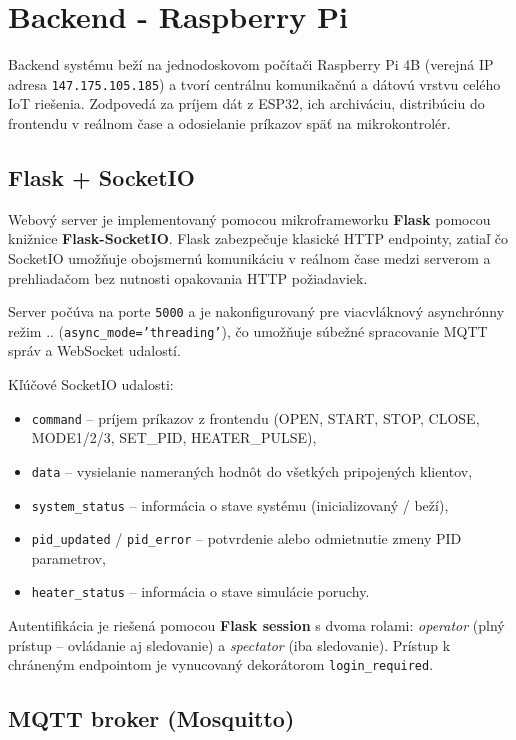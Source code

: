 \section{Backend - Raspberry Pi}

Backend systému beží na jednodoskovom počítači Raspberry Pi 4B (verejná IP adresa
\texttt{147.175.105.185}) a tvorí centrálnu komunikačnú a dátovú vrstvu celého IoT
riešenia. Zodpovedá za príjem dát z ESP32, ich archiváciu, distribúciu do frontendu
v reálnom čase a odosielanie príkazov späť na mikrokontrolér.

\subsection{Flask + SocketIO}

Webový server je implementovaný pomocou mikroframeworku \textbf{Flask} pomocou
knižnice \textbf{Flask-SocketIO}. Flask zabezpečuje klasické HTTP endpointy, zatiaľ čo SocketIO umožňuje obojsmernú
komunikáciu v reálnom čase medzi serverom a prehliadačom bez nutnosti opakovania
HTTP požiadaviek.

Server počúva na porte \texttt{5000} a je nakonfigurovaný pre viacvláknový asynchrónny
režim ..
(\texttt{async\_mode='threading'}), čo umožňuje súbežné spracovanie MQTT správ
a WebSocket udalostí.

Kľúčové SocketIO udalosti:
\begin{itemize}
  \item \texttt{command} -- príjem príkazov z frontendu (OPEN, START, STOP, CLOSE,
        MODE1/2/3, SET\_PID, HEATER\_PULSE),
  \item \texttt{data} -- vysielanie nameraných hodnôt do všetkých pripojených klientov,
  \item \texttt{system\_status} -- informácia o stave systému (inicializovaný / beží),
  \item \texttt{pid\_updated} / \texttt{pid\_error} -- potvrdenie alebo odmietnutie
        zmeny PID parametrov,
  \item \texttt{heater\_status} -- informácia o stave simulácie poruchy.
\end{itemize}

Autentifikácia je riešená pomocou \textbf{Flask session} s dvoma rolami:
\textit{operator} (plný prístup – ovládanie aj sledovanie) a \textit{spectator}
(iba sledovanie). Prístup k chráneným endpointom je vynucovaný dekorátorom
\texttt{login\_required}.

\subsection{MQTT broker (Mosquitto)}

